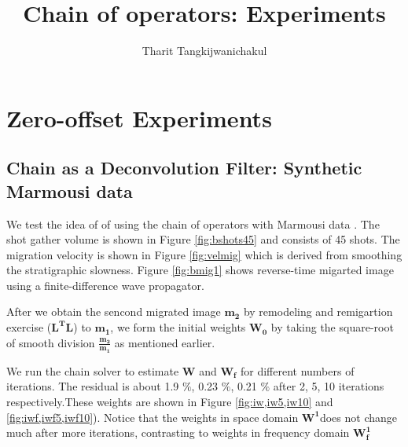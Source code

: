 \title{Chain of operators: Experiments}
\renewcommand{\thefootnote}{\fnsymbol{footnote}}
\relax{}
\author{Tharit Tangkijwanichakul}
\label{ch:chapter-lsrtm}

\maketitle

\section{Zero-offset Experiments}

\subsection{Chain as a Deconvolution Filter: Synthetic Marmousi data}
%

We test the idea of of using the chain of operators with Marmousi data \cite[]{versteeg1994}. The shot gather volume is shown in Figure \ref{fig:bshots45} and consists of 45 shots. The migration velocity is shown in Figure \ref{fig:velmig} which is derived from smoothing the stratigraphic slowness. Figure \ref{fig:bmig1} shows reverse-time migarted image using a finite-difference wave propagator. 


%

After we obtain the sencond migrated image $\mathbf{m_2}$ by remodeling and remigartion exercise ($\mathbf{L^{T}L}$) to $\mathbf{m_1}$, we form the initial weights $\mathbf{W_0}$ by taking the square-root of smooth division $\mathbf{\frac{m_2}{m_1}}$ as mentioned earlier.

We run the chain solver to estimate $\mathbf{W}$ and $\mathbf{W_f}$ for different numbers of iterations. The residual is about 1.9 $\%$, 0.23 $\%$, 0.21 $\%$ after 2, 5, 10 iterations respectively.These weights are shown in Figure \ref{fig:iw,iw5,iw10} and \ref{fig:iwf,iwf5,iwf10}). Notice that the weights in space domain $\mathbf{W^{1}}$does not change much after more iterations, contrasting to weights in frequency domain $\mathbf{W_f^{1}}$


